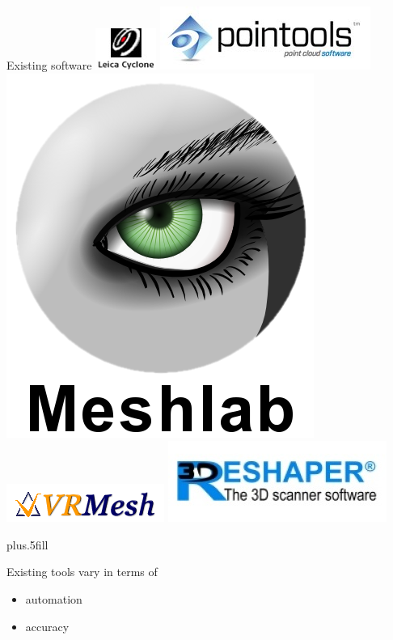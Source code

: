\documentclass{beamer}
\begin{document}
\begin{frame}{Existing software}
\includegraphics[height=0.10\textheight]{pics/cyclone.jpg}
\includegraphics[height=0.10\textheight]{pics/pointools.jpg}
\includegraphics[height=0.10\textheight]{pics/meshlab.png}
\includegraphics[height=0.10\textheight]{pics/vrmesh.png}
\includegraphics[height=0.10\textheight]{pics/3dreshaper.jpg}

\vskip0pt plus.5fill

Existing tools vary in terms of
\begin{itemize}
\item automation
\item accuracy
\end{itemize}


\end{frame}
\end{document}
